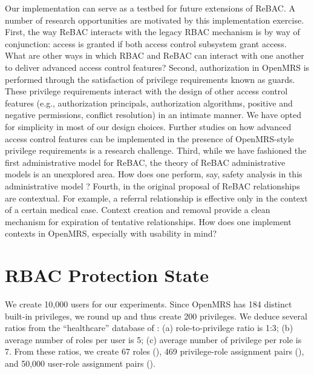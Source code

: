 \documentclass{acm_proc_article-sp}
\begin{document}
Our implementation can serve as a testbed for future extensions of
ReBAC.  A number of research opportunities are motivated by this
implementation exercise.  First, the way ReBAC interacts with the
legacy RBAC mechanism is by way of conjunction: access is granted if
both access control subsystem grant access.  What are other ways in
which RBAC and ReBAC can interact with one another to deliver advanced
access control features?  Second, authorization in OpenMRS is
performed through the satisfaction of privilege requirements known as
guards.  These privilege requirements interact with the design of
other access control features (e.g., authorization principals,
authorization algorithms, positive and negative permissions, conflict
resolution) in an intimate manner.  We have opted for simplicity in
most of our design choices.  Further studies on how advanced access
control features can be implemented in the presence of OpenMRS-style
privilege requirements is a research challenge.  Third, while we have
fashioned the first administrative model for ReBAC, the theory of
ReBAC administrative models is an unexplored area.  How does one
perform, say, safety analysis in this administrative model \cite{HRU}?
Fourth, in the original proposal of ReBAC \cite{Fong:2011}
relationships are contextual.  For example, a referral relationship is
effective only in the context of a certain medical case.  Context
creation and removal provide a clean mechanism for expiration of
tentative relationships.  How does one implement contexts in OpenMRS,
especially with usability in mind?


  






\appendix


\section{RBAC Protection State}
\label{app-RBAC}

We create 10,000 users for our experiments.  Since OpenMRS has 184
distinct built-in privileges, we round up and thus create 200
privileges.  We deduce several ratios from the ``healthcare'' database
of \cite{Ene-et-al:2008}: (a) role-to-privilege ratio is 1:3; (b)
average number of roles per user is 5; (c) average number of privilege
per role is 7.  From these ratios, we create 67 roles (), 469 privilege-role assignment pairs (),
and 50,000 user-role assignment pairs ().
\end{document}
